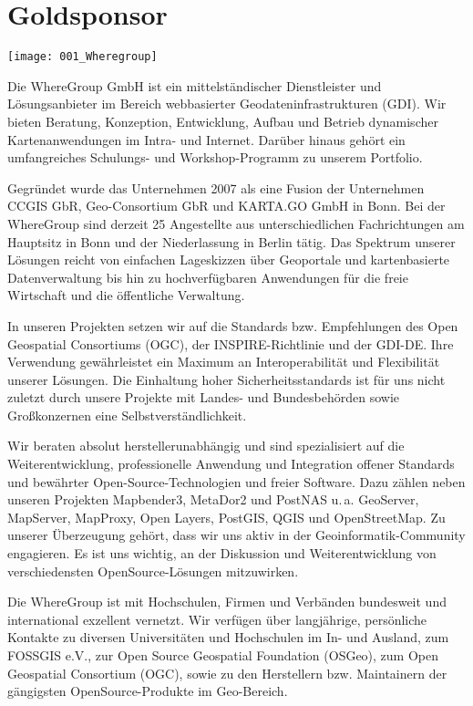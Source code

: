 \section*{Goldsponsor}
\begin{center}
	\texttt{[image: 001\_Wheregroup]}
\end{center}
Die WhereGroup GmbH ist ein mittelständischer Dienst\-leister und Lösungsanbieter im Bereich 
webbasierter Geodateninfrastrukturen (GDI). Wir bieten Beratung, Konzeption, Entwicklung, 
Aufbau und Betrieb dynamischer Kartenanwendungen im Intra- und Internet. Da\-rüber 
hinaus gehört ein umfangreiches Schulungs- und Workshop-Pro\-gramm zu unserem Portfolio.

Gegründet wurde das Unternehmen 2007 als eine Fusion der Unternehmen CCGIS GbR, 
Geo-Consortium GbR und KARTA.GO GmbH in Bonn. Bei der WhereGroup sind derzeit 25 
Angestellte aus unterschiedlichen Fachrichtungen am Hauptsitz in Bonn und der Niederlassung in Berlin tätig. 
Das Spektrum unserer Lösungen reicht von einfachen Lageskizzen über Geoportale und 
kartenbasierte Datenverwaltung bis hin zu hochverfügbaren Anwendungen für die freie 
Wirtschaft und die öffentliche Verwaltung. 

In unseren Projekten setzen wir auf die Standards bzw. Empfehlungen des Open Geospatial 
Consortiums (OGC), der INSPIRE-Richtlinie und der GDI-DE. Ihre Verwendung gewährleistet 
ein Maximum an Interoperabilität und Flexibilität unserer Lösungen. Die Einhaltung hoher 
Sicherheitsstandards ist für uns nicht zuletzt durch unsere Projekte mit Landes- und 
Bundesbehörden sowie Großkonzernen eine Selbstverständlichkeit.

Wir beraten absolut herstellerunabhängig und sind spe\-zialisiert auf die Weiter\-ent\-wicklung, professionelle Anwendung 
und Integration offener Standards und bewährter Open-Source-Technologien und 
freier Software. Dazu zäh\-len neben unseren Projekten Mapbender3, MetaDor2 und PostNAS u.\,a. GeoServer, MapServer, Map\-Proxy, Open Layers, PostGIS, QGIS und OpenStreetMap.
Zu unserer Überzeugung gehört, dass wir uns aktiv in der Geoinfor\-matik-Community engagieren. 
Es ist uns wichtig, an der Diskussion und Weiterentwicklung von verschiedensten OpenSource-Lösungen mitzuwirken.

Die WhereGroup ist mit Hochschulen, Firmen und Verbänden bundesweit und international exzellent 
vernetzt. Wir verfügen über langjährige, persönliche Kontakte zu diversen Universitäten und 
Hochschulen im In- und Ausland, zum FOSSGIS e.V., zur Open Source Geospatial Foundation (OSGeo), 
zum Open Geospatial Consortium (OGC), sowie zu den Herstellern bzw. Maintainern der gängigsten 
OpenSource-Produkte im Geo-Bereich.